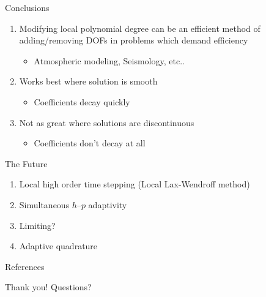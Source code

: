 \documentclass[sansserif]{beamer}
\begin{document}
\begin{frame}{Conclusions}
\begin{enumerate}
\item<1-> Modifying local polynomial degree can be an efficient method of adding/removing DOFs in problems which demand efficiency
	\begin{itemize}
	\item<1-> Atmospheric modeling, Seismology, etc..
	\end{itemize}
\item<2-> Works best where solution is smooth
	\begin{itemize}
	\item<2-> Coefficients decay quickly
	\end{itemize}
\item<3-> Not as great where solutions are discontinuous
	\begin{itemize}
	\item<3-> Coefficients don't decay at all
	\end{itemize}
\end{enumerate}
\end{frame}

\begin{frame}{The Future}
\begin{enumerate}
\item Local high order time stepping (Local Lax-Wendroff method)
\item Simultaneous $h$--$p$ adaptivity
\item Limiting?
\item Adaptive quadrature
\end{enumerate}
\end{frame}

\begin{frame}{References}
\nocite{remacle2003adaptive,berger1998adaptive,eskilsson2011hp,tumolo2013semi}
 \small %
\end{frame}

\begin{frame}{Thank you!}
Questions?
\end{frame}
\end{document}
